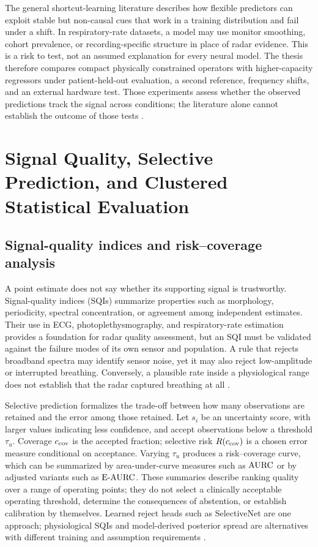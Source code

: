 The general shortcut-learning literature describes how flexible predictors can exploit stable but
non-causal cues that work in a training distribution and fail under a shift. In respiratory-rate
datasets, a model may use monitor smoothing, cohort prevalence, or recording-specific structure in
place of radar evidence. This is a risk to test, not an assumed explanation for every neural model.
The thesis therefore compares compact physically constrained operators with higher-capacity
regressors under patient-held-out evaluation, a second reference, frequency shifts, and an external
hardware test. Those experiments assess whether the observed predictions track the signal across
conditions; the literature alone cannot establish the outcome of those tests
\citep{geirhos2020shortcut,riou2023pesto}.

\section{Signal Quality, Selective Prediction, and Clustered Statistical Evaluation}
\label{sec:ch2_uncertainty_statistics}

\subsection{Signal-quality indices and risk--coverage analysis}

A point estimate does not say whether its supporting signal is trustworthy. Signal-quality indices
(SQIs) summarize properties such as morphology, periodicity, spectral concentration, or agreement
among independent estimates. Their use in ECG, photoplethysmography, and respiratory-rate
estimation provides a foundation for radar quality assessment, but an SQI must be validated against
the failure modes of its own sensor and population. A rule that rejects broadband spectra may
identify sensor noise, yet it may also reject low-amplitude or interrupted breathing. Conversely,
a plausible rate inside a physiological range does not establish that the radar captured breathing
at all \citep{orphanidou2015signal,birrenkott2018robust}.

Selective prediction formalizes the trade-off between how many observations are retained and the
error among those retained. Let $s_i$ be an uncertainty score, with larger values indicating less
confidence, and accept observations below a threshold $\tau_u$. Coverage $c_{\mathrm{cov}}$ is the
accepted fraction; selective risk $R(c_{\mathrm{cov}})$ is a chosen error measure conditional on acceptance.
Varying $\tau_u$ produces a risk--coverage curve, which can be summarized by area-under-curve
measures such as $\mathrm{AURC}$ or by adjusted variants such as $\mathrm{E\text{-}AURC}$. These summaries
describe ranking quality over a range of operating points; they do not select a clinically
acceptable operating threshold, determine the consequences of abstention, or establish calibration
by themselves. Learned reject heads such as SelectiveNet are one approach; physiological SQIs and
model-derived posterior spread are alternatives with different training and assumption requirements
\citep{elyaniv2010foundations,geifman2017selective,geifman2019selectivenet,traub2024overcoming}.

